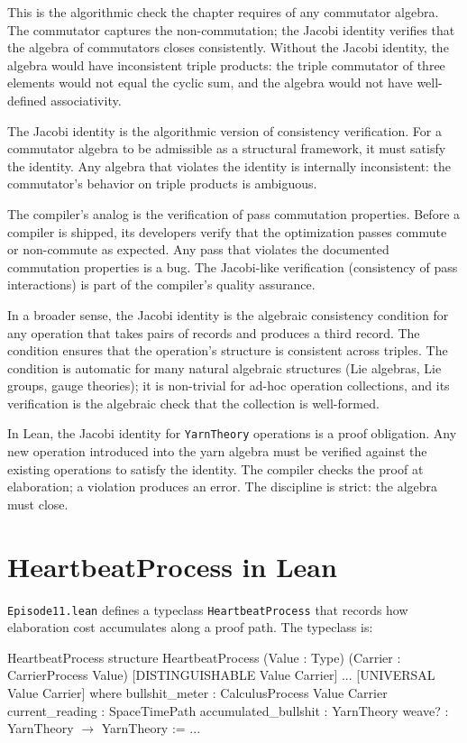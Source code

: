 This is the algorithmic check the chapter requires of any
commutator algebra. The commutator captures the non-commutation;
the Jacobi identity verifies that the algebra of commutators
closes consistently. Without the Jacobi identity, the algebra
would have inconsistent triple products: the triple commutator
of three elements would not equal the cyclic sum, and the algebra
would not have well-defined associativity.

The Jacobi identity is the algorithmic version of consistency
verification. For a commutator algebra to be admissible as a
structural framework, it must satisfy the identity. Any algebra
that violates the identity is internally inconsistent: the
commutator's behavior on triple products is ambiguous.

The compiler's analog is the verification of pass commutation
properties. Before a compiler is shipped, its developers verify
that the optimization passes commute or non-commute as expected.
Any pass that violates the documented commutation properties is
a bug. The Jacobi-like verification (consistency of pass
interactions) is part of the compiler's quality assurance.

In a broader sense, the Jacobi identity is the algebraic
consistency condition for any operation that takes pairs of
records and produces a third record. The condition ensures that
the operation's structure is consistent across triples. The
condition is automatic for many natural algebraic structures
(Lie algebras, Lie groups, gauge theories); it is non-trivial for
ad-hoc operation collections, and its verification is the
algebraic check that the collection is well-formed.

In Lean, the Jacobi identity for \texttt{YarnTheory} operations
is a proof obligation. Any new operation introduced into the
yarn algebra must be verified against the existing operations
to satisfy the identity. The compiler checks the proof at
elaboration; a violation produces an error. The discipline is
strict: the algebra must close.

\section{HeartbeatProcess in Lean}
\label{se:heartbeatprocess-in-lean}

\texttt{Episode11.lean} defines a typeclass \texttt{HeartbeatProcess}
that records how elaboration cost accumulates along a proof path. The
typeclass is:

\begin{leanexcerpt}{HeartbeatProcess}
structure HeartbeatProcess
    (Value : Type)
    (Carrier : CarrierProcess Value)
    [DISTINGUISHABLE Value Carrier] ... [UNIVERSAL Value Carrier]
  where
  bullshit_meter       : CalculusProcess Value Carrier
  current_reading      : SpaceTimePath
  accumulated_bullshit : YarnTheory
  weave? : YarnTheory $\to$ YarnTheory := ...
\end{leanexcerpt}

